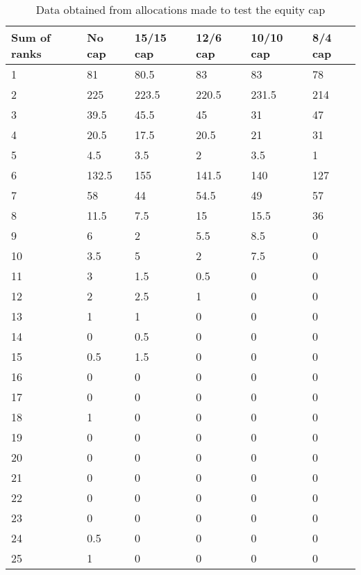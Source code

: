 \begin{table}
  \begin{center}
    \begin{tabular}{ | l | l | l | l | l | l | }
      \hline
      \textbf{Sum of ranks} & \textbf{No cap} & \textbf{15/15 cap} & \textbf{12/6 cap} & \textbf{10/10 cap} & \textbf{8/4 cap} \\
      \hline
      1 & 81 & 80.5 & 83 & 83 & 78 \\
      2 & 225 & 223.5 & 220.5 & 231.5 & 214 \\
      3 & 39.5 & 45.5 & 45 & 31 & 47 \\
      4 & 20.5 & 17.5 & 20.5 & 21 & 31 \\
      5 & 4.5 & 3.5 & 2 & 3.5 & 1 \\
      6 & 132.5 & 155 & 141.5 & 140 & 127 \\
      7 & 58 & 44 & 54.5 & 49 & 57 \\
      8 & 11.5 & 7.5 & 15 & 15.5 & 36 \\
      9 & 6 & 2 & 5.5 & 8.5 & 0 \\
      10 & 3.5 & 5 & 2 & 7.5 & 0 \\
      11 & 3 & 1.5 & 0.5 & 0 & 0 \\
      12 & 2 & 2.5 & 1 & 0 & 0 \\
      13 & 1 & 1 & 0 & 0 & 0 \\
      14 & 0 & 0.5 & 0 & 0 & 0 \\
      15 & 0.5 & 1.5 & 0 & 0 & 0 \\
      16 & 0 & 0 & 0 & 0 & 0 \\
      17 & 0 & 0 & 0 & 0 & 0 \\
      18 & 1 & 0 & 0 & 0 & 0 \\
      19 & 0 & 0 & 0 & 0 & 0 \\
      20 & 0 & 0 & 0 & 0 & 0 \\
      21 & 0 & 0 & 0 & 0 & 0 \\
      22 & 0 & 0 & 0 & 0 & 0 \\
      23 & 0 & 0 & 0 & 0 & 0 \\
      24 & 0.5 & 0 & 0 & 0 & 0 \\
      25 & 1 & 0 & 0 & 0 & 0 \\
      \hline
    \end{tabular}
  \end{center}
  \caption{Data obtained from allocations made to test the equity cap}
  \label{gurobi_equity_table}
\end{table}

